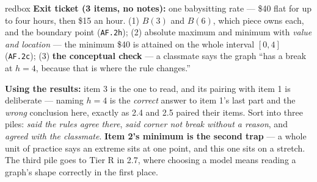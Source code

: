 \documentclass[10pt]{article}
\begin{document}
\boxguard[16]
\begin{skillbox}{redbox}
\textbf{Exit ticket (3 items, no notes):} one babysitting rate --- \$40 flat for up to four hours,
then \$15 an hour. (1) $B(3)$ and $B(6)$, which piece owns each, and the boundary point
(\texttt{AF.2h}); (2) absolute maximum and minimum with \emph{value and location} --- the minimum
\$40 is attained on the whole interval $[0,4]$ (\texttt{AF.2c}); (3) \textbf{the conceptual check} ---
a classmate says the graph ``has a break at $h=4$, because that is where the rule changes.''

\textbf{Using the results:} item 3 is the one to read, and its pairing with item 1 is deliberate ---
naming $h=4$ is the \emph{correct} answer to item 1's last part and the \emph{wrong} conclusion here,
exactly as 2.4 and 2.5 paired their items. Sort into three piles: \emph{said the rules agree there},
\emph{said corner not break without a reason}, and \emph{agreed with the classmate}. \textbf{Item 2's
minimum is the second trap} --- a whole unit of practice says an extreme sits at one point, and this
one sits on a stretch. The third pile goes to Tier R in 2.7, where choosing a model means reading a
graph's shape correctly in the first place.
\end{skillbox}
\end{document}
